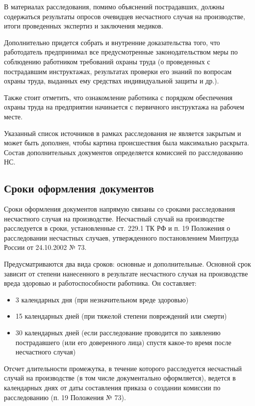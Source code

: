 В материалах расследования, помимо объяснений пострадавших, должны содержаться результаты опросов очевидцев несчастного случая на производстве, итоги проведенных экспертиз и заключения медиков.


Дополнительно придется собрать и внутренние доказательства того, что работодатель предпринимал все предусмотренные законодательством меры по соблюдению работником требований охраны труда (о проведенных с пострадавшим инструктажах, результатах проверки его знаний по вопросам охраны труда, выданных ему средствах индивидуальной защиты и др.).


Также стоит отметить, что ознакомление работника с порядком обеспечения охраны труда на предприятии начинается с первичного инструктажа на рабочем месте.


Указанный список источников в рамках расследования не является закрытым и может быть дополнен, чтобы картина происшествия была максимально раскрыта. Состав дополнительных документов определяется комиссией по расследованию НС.

\subsection{Сроки оформления документов}
Сроки оформления документов напрямую связаны со сроками расследования несчастного случая на производстве. Несчастный случай на производстве расследуется в сроки, установленные ст. 229.1 ТК РФ и п. 19 Положения о расследовании несчастных случаев, утвержденного постановлением Минтруда России от 24.10.2002 № 73.


Предусматриваются два вида сроков: основные и дополнительные. Основной срок зависит от степени нанесенного в результате несчастного случая на производстве вреда здоровью и работоспособности работника. Он составляет:
\begin{itemize}
    \item 3 календарных дня (при незначительном вреде здоровью)
    \item 15 календарных дней (при тяжелой степени повреждений или смерти)
    \item 30 календарных дней (если расследование проводится по заявлению пострадавшего (или его доверенного лица) спустя какое-то время после несчастного случая)
\end{itemize}


Отсчет длительности промежутка, в течение которого расследуется несчастный случай на производстве (в том числе документально оформляется), ведется в календарных днях от даты составления приказа о создании комиссии по расследованию (п. 19 Положения № 73).


